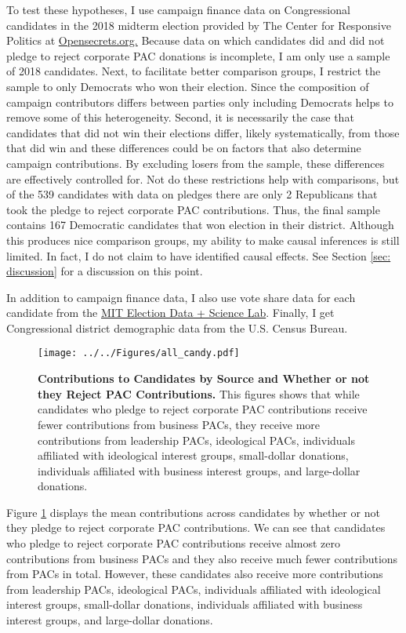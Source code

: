 \documentclass[12pt]{article}
\begin{document}
To test these hypotheses, I use campaign finance data on Congressional candidates in the 2018 midterm election provided by The Center for Responsive Politics at \href{https://www.opensecrets.org}{Opensecrets.org.} Because data on which candidates did and did not pledge to reject corporate PAC donations is incomplete, I am only use a sample of 2018 candidates. Next, to facilitate better comparison groups, I restrict the sample to only Democrats who won their election. Since the composition of campaign contributors differs between parties only including Democrats helps to remove some of this heterogeneity. Second, it is necessarily the case that candidates that did not win their elections differ, likely systematically, from those that did win and these differences could be on factors that also determine campaign contributions. By excluding losers from the sample, these differences are effectively controlled for. Not do these restrictions help with comparisons, but of the 539 candidates with data on pledges there are only 2 Republicans that took the pledge to reject corporate PAC contributions. Thus, the final sample contains 167 Democratic candidates that won election in their district. Although this produces nice comparison groups, my ability to make causal inferences is still limited. In fact, I do not claim to have identified causal effects. See Section \ref{sec: discussion} for a discussion on this point. 

In addition to campaign finance data, I also use vote share data for each candidate from the \href{https://electionlab.mit.edu/data}{MIT Election Data + Science Lab}. Finally, I get Congressional district demographic data from the U.S. Census Bureau.  

\begin{figure}[ht]
	\centering
	\texttt{[image: ../../Figures/all\_candy.pdf]}
	\caption{\textbf{Contributions to Candidates by Source and Whether or not they Reject PAC Contributions.} This figures shows that while candidates who pledge to reject corporate PAC contributions receive fewer contributions from business PACs, they receive more contributions from leadership PACs, ideological PACs, individuals affiliated with ideological interest groups, small-dollar donations, individuals affiliated with business interest groups, and large-dollar donations.}
	\label{fig: all contribs}
\end{figure}

Figure \ref{fig: all contribs} displays the mean contributions across candidates by whether or not they pledge to reject corporate PAC contributions. We can see that candidates who pledge to reject corporate PAC contributions receive almost zero contributions from business PACs and they also receive much fewer contributions from PACs in total. However, these candidates also receive more contributions from leadership PACs, ideological PACs, individuals affiliated with ideological interest groups, small-dollar donations, individuals affiliated with business interest groups, and large-dollar donations.
\end{document}
